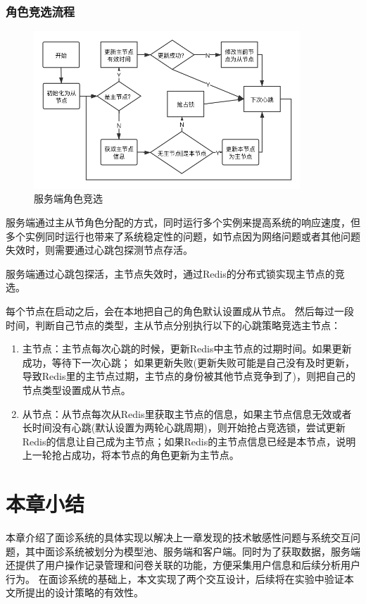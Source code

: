 \subsubsection{角色竞选流程}

\begin{figure}
    \centering
    \includegraphics[width=10cm]{images/slave-master.png}
    \caption{服务端角色竞选}
    \label{fig:slave_master}
\end{figure}

服务端通过主从节角色分配的方式，同时运行多个实例来提高系统的响应速度，但多个实例同时运行也带来了系统稳定性的问题，如节点因为网络问题或者其他问题失效时，则需要通过心跳包探测节点存活。

服务端通过心跳包探活，主节点失效时，通过Redis的分布式锁实现主节点的竞选。

每个节点在启动之后，会在本地把自己的角色默认设置成从节点。
然后每过一段时间，判断自己节点的类型，主从节点分别执行以下的心跳策略竞选主节点：
\begin{enumerate}
    \item 主节点：主节点每次心跳的时候，更新Redis中主节点的过期时间。如果更新成功，等待下一次心跳； 如果更新失败(更新失败可能是自己没有及时更新，导致Redis里的主节点过期，主节点的身份被其他节点竞争到了)，则把自己的节点类型设置成从节点。
    
    \item 从节点：从节点每次从Redis里获取主节点的信息，如果主节点信息无效或者长时间没有心跳(默认设置为两轮心跳周期)，则开始抢占竞选锁，尝试更新Redis的信息让自己成为主节点；如果Redis的主节点信息已经是本节点，说明上一轮抢占成功，将本节点的角色更新为主节点。 
\end{enumerate}


\section{本章小结}
本章介绍了面诊系统的具体实现以解决上一章发现的技术敏感性问题与系统交互问题，其中面诊系统被划分为模型池、服务端和客户端。同时为了获取数据，服务端还提供了用户操作记录管理和问卷关联的功能，方便采集用户信息和后续分析用户行为。
在面诊系统的基础上，本文实现了两个交互设计，后续将在实验中验证本文所提出的设计策略的有效性。